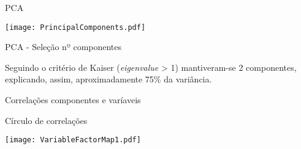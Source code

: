 \documentclass[xcolor=dvipsnames,table]{beamer}
\begin{document}
	
	\begin{frame}{PCA}
	
		\begin{center}
    	\texttt{[image: PrincipalComponents.pdf]}
  		\end{center}
	
	
	\end{frame}
	\begin{frame}{PCA - Seleção nº componentes}
	
	Seguindo o critério de Kaiser (\textit{eigenvalue} > 1) mantiveram-se 2 componentes, explicando, assim, aproximadamente 75\% da variância. 
	
	
	
	
	\end{frame}
	
	
	\begin{frame}{Correlações componentes e varíaveis}
		\begin{table}[h]
        \centering
        \end{table}
	
	\end{frame}
	
	\begin{frame}{Círculo de correlações}
	
		\begin{center}
    	\texttt{[image: VariableFactorMap1.pdf]}
  		\end{center}
	
	\end{frame}
	
\end{document}
